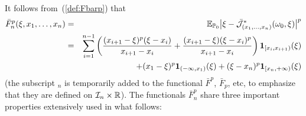 \smallskip
It follows from~(\ref{def:Fbarp}) that
\begin{eqnarray}
\nonumber\bar F_n^p(\xi, x_1,\ldots,x_n) &=&   \E_{\Prob_0}\big|\xi -{\cal
\bar J}^*_{(x_1,\ldots,x_n)}(\omega_0,\xi)\big|^p\\
\label{eq:Fbard=1}
&=& \sum_{i=1}^{n-1}\left(\frac{(x_{i+1}-\xi)^p(\xi-x_i)}{x_{i+1}-x_i}+\frac{(x_{i+1}-\xi)(\xi-x_i)^p}{x_{i+1}-x_i}\right ) \mbox{\bf 1}_{[x_i,x_{i+1})}(\xi)\\
&& + (x_1-\xi )^p\mbox{\bf 1}_{(-\infty,x_1)}(\xi)+ (\xi-x_n)^p \mbox{\bf 1}_{[
x_n,+\infty)}(\xi)\nonumber
\end{eqnarray}
(the subscript $_n$ is temporarily added to the functional $\bar F^p$, $\bar F_p$, etc,  to emphasize that they are defined on $ {\cal I}_n\times \mathbb{R}$).
The   functionals $\bar F_n^p$ share three important properties   extensively used  in what follows:

